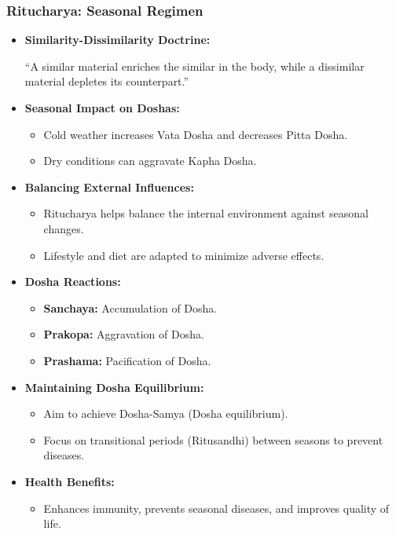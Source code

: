 \begin{frame}[fragile]\frametitle{Ritucharya: Seasonal Regimen}

      \begin{itemize}
        \item \textbf{Similarity-Dissimilarity Doctrine:} 
        
        “A similar material enriches the similar in the body, while a dissimilar material depletes its counterpart.”
        
        \item \textbf{Seasonal Impact on Doshas:} 
        \begin{itemize}
            \item Cold weather increases Vata Dosha and decreases Pitta Dosha.
            \item Dry conditions can aggravate Kapha Dosha.
        \end{itemize}
        \item \textbf{Balancing External Influences:} 
        \begin{itemize}
            \item Ritucharya helps balance the internal environment against seasonal changes.
            \item Lifestyle and diet are adapted to minimize adverse effects.
        \end{itemize}
        \item \textbf{Dosha Reactions:} 
        \begin{itemize}
            \item \textbf{Sanchaya:} Accumulation of Dosha.
            \item \textbf{Prakopa:} Aggravation of Dosha.
            \item \textbf{Prashama:} Pacification of Dosha.
        \end{itemize}
        \item \textbf{Maintaining Dosha Equilibrium:} 
        \begin{itemize}
            \item Aim to achieve Dosha-Samya (Dosha equilibrium).
            \item Focus on transitional periods (Ritusandhi) between seasons to prevent diseases.
        \end{itemize}
        \item \textbf{Health Benefits:} 
        \begin{itemize}
            \item Enhances immunity, prevents seasonal diseases, and improves quality of life.
        \end{itemize}
      \end{itemize}

\end{frame}

